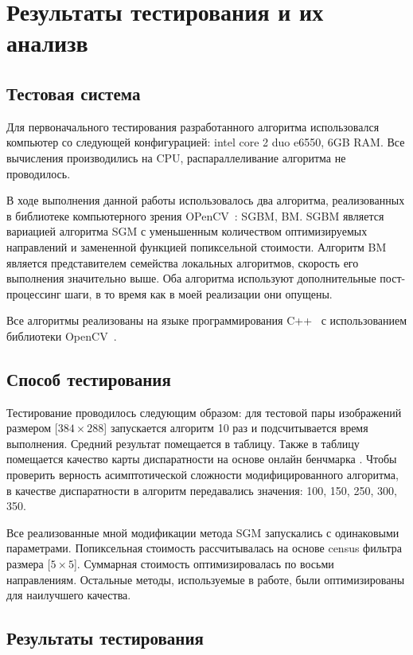 \chapter{Результаты тестирования и их анализв}
\label{chapter3}

\section{Тестовая система}
Для первоначального тестирования разработанного алгоритма использовался компьютер со следующей конфигурацией: intel core 2 duo e6550, 6GB RAM. Все вычисления производились на CPU, распараллеливание алгоритма не проводилось.

В ходе выполнения данной работы использовалось два алгоритма, реализованных в библиотеке компьютерного зрения OPenCV~\cite{opencv}: SGBM, BM. SGBM является вариацией алгоритма SGM с уменьшенным количеством оптимизируемых направлений и замененной функцией попиксельной стоимости. Алгоритм BM является представителем семейства локальных алгоритмов, скорость его выполнения значительно выше. Оба алгоритма используют дополнительные пост-процессинг шаги, в то время как в моей реализации они опущены.

Все алгоритмы реализованы на языке программирования C++~\cite{c++} с использованием библиотеки OpenCV~\cite{opencv}.

\section{Способ тестирования}
Тестирование проводилось следующим образом: для тестовой пары изображений размером [$ 384 \times 288 $] запускается алгоритм 10 раз и  подсчитывается время выполнения. Средний результат помещается в таблицу. Также в таблицу помещается качество карты диспаратности на основе онлайн бенчмарка \cite{middlebury}. Чтобы проверить верность асимптотической сложности модифицированного алгоритма, в качестве диспаратности в алгоритм передавались значения: 100, 150, 250, 300, 350.

Все реализованные мной модификации метода SGM запускались с одинаковыми параметрами. Попиксельная стоимость рассчитывалась на основе census фильтра размера [$ 5 \times 5 $]. Суммарная стоимость оптимизировалась по восьми направлениям. Остальные методы, используемые в работе, были оптимизированы для наилучшего качества.

\section{Результаты тестирования}

